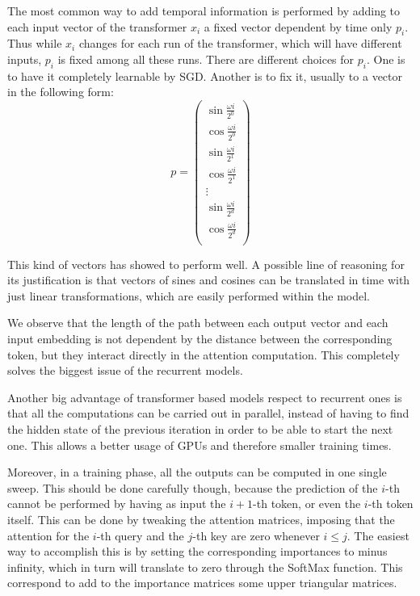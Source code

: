 \documentclass[]{marticle}
\begin{document}
The most common way to add temporal information is performed by adding to each input vector of the
transformer $x_i$ a fixed vector dependent by time only $p_i$. Thus while $x_i$ changes for each run
of the transformer, which will have different inputs, $p_i$ is fixed among all these runs. There are
different choices for $p_i$. One is to have it completely learnable by SGD. Another is to fix it,
usually to a vector in the following form:
$$ p = \begin{pmatrix}
\sin\frac{\omega i}{2^0} \\
\cos\frac{\omega i}{2^0} \\
\sin\frac{\omega i}{2^1} \\
\cos\frac{\omega i}{2^1} \\
\vdots \\
\sin\frac{\omega i}{2^d} \\
\cos\frac{\omega i}{2^d} \\
\end{pmatrix} $$

This kind of vectors has showed to perform well. A possible line of reasoning for its justification
is that vectors of sines and cosines can be translated in time with just linear transformations,
which are easily performed within the model.

We observe that the length of the path between each output vector and each input embedding is not
dependent by the distance between the corresponding token, but they interact directly in the
attention computation. This completely solves the biggest issue of the recurrent models.

Another big advantage of transformer based models respect to recurrent ones is that all the
computations can be carried out in parallel, instead of having to find the hidden state of the
previous iteration in order to be able to start the next one. This allows a better usage of GPUs and
therefore smaller training times.

Moreover, in a training phase, all the outputs can be computed in one single sweep. This should be
done carefully though, because the prediction of the $i$-th cannot be performed by having as input
the $i+1$-th token, or even the $i$-th token itself. This can be done by tweaking the attention
matrices, imposing that the attention for the $i$-th query and the $j$-th key are zero whenever $i
\leq j$. The easiest way to accomplish this is by setting the corresponding importances to minus
infinity, which in turn will translate to zero through the SoftMax function. This correspond to add
to the importance matrices some upper triangular matrices.
\end{document}
